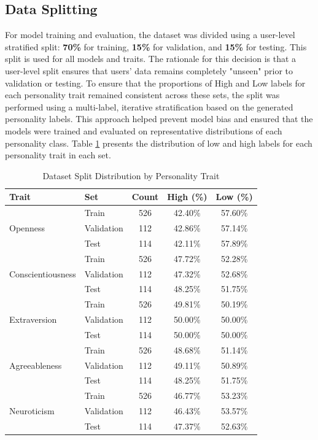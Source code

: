 \subsection{Data Splitting}
For model training and evaluation, the dataset was divided using a user-level stratified split: \textbf{70\%} for training, \textbf{15\%} for validation, and \textbf{15\%} for testing. This split is used for all models and traits. The rationale for this decision is that a user-level split ensures that users' data remains completely "unseen" prior to validation or testing. To ensure that the proportions of High and Low labels for each personality trait remained consistent across these sets, the split was performed using a multi-label, iterative stratification based on the generated personality labels. This approach helped prevent model bias and ensured that the models were trained and evaluated on representative distributions of each personality class. Table \ref{tab:tvt_distribution} presents the distribution of low and high labels for each personality trait in each set.

\begin{table}[h]
\centering
\caption{Dataset Split Distribution by Personality Trait}
\label{tab:tvt_distribution}
\begin{tabular}{llccc}
\hline
\textbf{Trait} & \textbf{Set} & \textbf{Count} & \textbf{High (\%)} & \textbf{Low (\%)} \\
\hline

\multirow{3}{*}{Openness}
 & Train & 526 & 42.40\% & 57.60\% \\
 & Validation & 112 & 42.86\% & 57.14\% \\
 & Test & 114 & 42.11\% & 57.89\% \\
\hline

\multirow{3}{*}{Conscientiousness}
 & Train & 526 & 47.72\% & 52.28\% \\
 & Validation & 112 & 47.32\% & 52.68\% \\
 & Test & 114 & 48.25\% & 51.75\% \\
\hline

\multirow{3}{*}{Extraversion}
 & Train & 526 & 49.81\% & 50.19\% \\
 & Validation & 112 & 50.00\% & 50.00\% \\
 & Test & 114 & 50.00\% & 50.00\% \\
\hline

\multirow{3}{*}{Agreeableness}
 & Train & 526 & 48.68\% & 51.14\% \\
 & Validation & 112 & 49.11\% & 50.89\% \\
 & Test & 114 & 48.25\% & 51.75\% \\
\hline

\multirow{3}{*}{Neuroticism}
 & Train & 526 & 46.77\% & 53.23\% \\
 & Validation & 112 & 46.43\% & 53.57\% \\
 & Test & 114 & 47.37\% & 52.63\% \\

\hline
\end{tabular}
\end{table}


